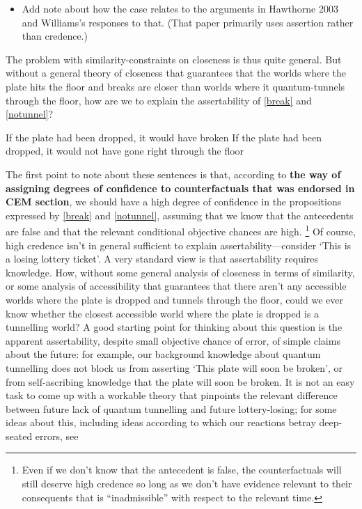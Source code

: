 \documentclass[leqno, 11pt, a5paper, openany]{article}
\begin{document}
\begin{itemize}
\item
  Add note about how the case relates to the arguments in Hawthorne 2003 and Williams's responses to that. (That paper primarily uses assertion rather than credence.)
\end{itemize}

The problem with similarity-constraints on closeness is thus quite general. But without a general theory of closeness that guarantees that the worlds where the plate hits the floor and breaks are closer than worlds where it quantum-tunnels through the floor, how are we to explain the assertability of \ref{break} and \ref{notunnel}?
\begin{prop}
\nitem \label{break}
  If the plate had been dropped, it would have broken
\nitem \label{notunnel}
  If the plate had been dropped, it would not have gone right through the floor
\end{prop}
The first point to note about these sentences is that, according to \textbf{the way of assigning degrees of confidence to counterfactuals that was endorsed in CEM section}, we should have a high degree of confidence in the propositions expressed by \ref{break} and \ref{notunnel}, assuming that we know that the antecedents are false and that the relevant conditional objective chances are high.%
\footnote{Even if we don't know that the antecedent is false, the counterfactuals will still deserve high credence so long as we don't have evidence relevant to their consequents that is “inadmissible” with respect to the relevant time.} 
Of course, high credence isn't in general sufficient to explain assertability---consider ‘This is a losing lottery ticket’. A very standard view is that assertability requires knowledge. How, without some general analysis of closeness in terms of similarity, or some analysis of accessibility that guarantees that there aren't any accessible worlds where the plate is dropped and tunnels through the floor, could we ever know whether the closest accessible world where the plate is dropped is a tunnelling world? A good starting point for thinking about this question is the apparent assertability, despite small objective chance of error, of simple claims about the future: for example, our background knowledge about quantum tunnelling does not block us from asserting ‘This plate will soon be broken’, or from self-ascribing knowledge that the plate will soon be broken. It is not an easy task to come up with a workable theory that pinpoints the relevant difference between future lack of quantum tunnelling and future lottery-losing; for some ideas about this, including ideas according to which our reactions betray deep-seated errors, see
\end{document}
